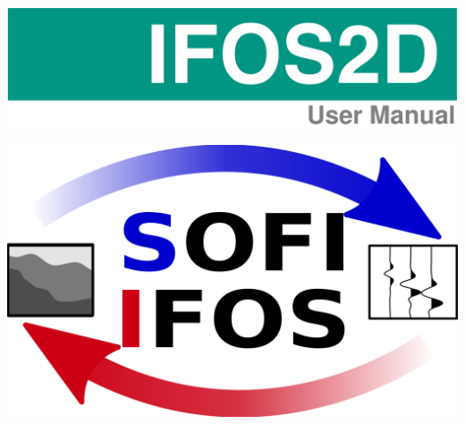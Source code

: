 \thispagestyle{empty}

\sffamily


\noindent\includegraphics[width=1.0\textwidth]{IFOS2D_title1.png}

\vspace{0.3 \textwidth}

\begin{center}
\includegraphics[width=.7\textwidth]{figures/logo_SOFI_IFOS.png}

\vspace{0.2\textwidth}

\end{center}
\rmfamily